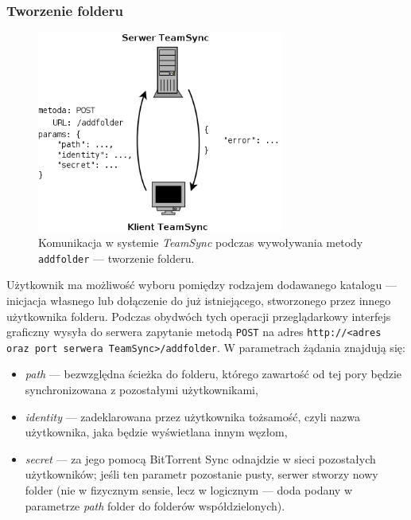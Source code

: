 \subsubsection*{Tworzenie folderu}

\begin{figure}[h!]
  \vspace{5pt}
  \begin{center}
    \includegraphics[width=230pt]{figures/metaddfolder.png}
  \end{center}
  \caption{Komunikacja w systemie \emph{TeamSync} podczas wywoływania metody \texttt{addfolder} --- tworzenie folderu.}
  \label{picmetgetfolders}
\end{figure}

Użytkownik ma możliwość wyboru pomiędzy rodzajem dodawanego katalogu --- inicjacja własnego lub dołączenie do już istniejącego, stworzonego przez innego użytkownika folderu. Podczas obydwóch tych operacji przeglądarkowy interfejs graficzny wysyła do serwera zapytanie metodą \texttt{POST} na adres \texttt{http://<adres oraz port serwera TeamSync>\-/addfolder}. W parametrach żądania znajdują się:

\begin{itemize}[noitemsep]
  \item \emph{path} --- bezwzględna ścieżka do folderu, którego zawartość od tej pory będzie synchronizowana z pozostałymi użytkownikami,
  
  \item \emph{identity} --- zadeklarowana przez użytkownika tożsamość, czyli nazwa użytkownika, jaka będzie wyświetlana innym węzłom,
  
  \item \emph{secret} --- za jego pomocą BitTorrent Sync odnajdzie w sieci pozostałych użytkowników; jeśli ten parametr pozostanie pusty, serwer stworzy nowy folder (nie w fizycznym sensie, lecz w logicznym --- doda podany w parametrze \emph{path} folder do folderów współdzielonych).
\end{itemize}

